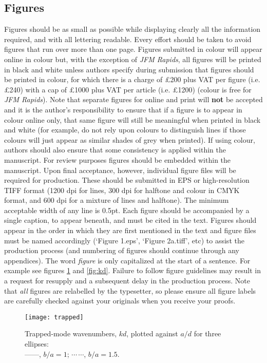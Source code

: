 \documentclass{jfm}
\begin{document}
\subsection{Figures}
Figures should be as small as possible while displaying clearly all the information required, and with all lettering readable. Every effort should be taken to avoid figures that run over more than one page. Figures submitted in colour will appear online in colour but, with the exception of {\it JFM Rapids}, all figures will be printed in black and white unless authors specify during submission that figures should be printed in colour, for which there is a charge of \pounds200 plus VAT per figure (i.e. \pounds240) with a cap of \pounds1000 plus VAT per article (i.e. \pounds1200) (colour is free for {\it JFM Rapids}).  Note that separate figures for online and print will {\bf not} be accepted and it is the author's responsibility to ensure that if a figure is to appear in colour online only, that same figure will still be meaningful when printed in black and white (for example, do not rely upon colours to distinguish lines if those colours will just appear as similar shades of grey when printed). If using colour, authors should also ensure that some consistency is applied within the manuscript. For review purposes figures should be embedded within the manuscript. Upon final acceptance, however, individual figure files will be required for production. These should be submitted in EPS or high-resolution TIFF format (1200 dpi for lines, 300 dpi for halftone and colour in CMYK format, and 600 dpi for a mixture of lines and halftone). The minimum acceptable width of any line is 0.5pt. Each figure should be accompanied by a single caption, to appear beneath, and must be cited in the text. Figures should appear in the order in which they are first mentioned in the text and figure files must be named accordingly (`Figure 1.eps', `Figure 2a.tiff', etc) to assist the production process (and numbering of figures should continue through any appendices). The word \textit {figure} is only capitalized at the start of a sentence. For example see figures \ref{fig:ka} and \ref{fig:kd}. Failure to follow figure guidelines may result in a request for resupply and a subsequent delay in the production process. Note that {\em all} figures are relabelled by the typesetter, so please ensure all figure labels are carefully checked against your originals when you receive your proofs.

\begin{figure}
  \centerline{\texttt{[image: trapped]}}%
  \caption{Trapped-mode wavenumbers, $kd$, plotted against $a/d$ for
    three ellipses:\protect\\
    ---$\!$---,
    $b/a=1$; $\cdots$\,$\cdots$, $b/a=1.5$.}
\label{fig:ka}
\end{figure}
\end{document}
